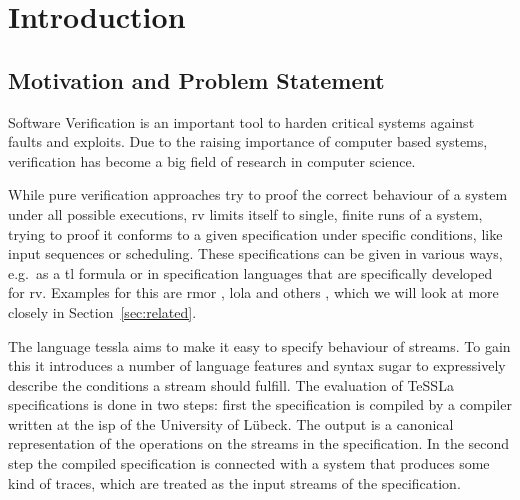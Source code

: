 %
\chapter{Introduction}
\label{sec:intro}


\section{Motivation and Problem Statement}
\label{sec:intro:motivation}

Software Verification is an important tool to harden critical systems against faults and exploits.
Due to the raising importance of computer based systems, verification has become a big field of research in computer science.

While pure verification approaches try to proof the correct behaviour of a system under all possible executions,
\gls{rv} limits itself to single, finite runs of a system, trying to proof it conforms to a given specification
under specific conditions, like input sequences or scheduling.
These specifications can be given in various ways, e.g.\ as a \gls{tl} formula or in specification languages that are specifically developed for \gls{rv}.
Examples for this are \gls{rmor} \citep{Havelund2008}, \gls{lola} \citep{DAngelo2005} and others \citep{Zheng2015, Pike2010, Mostafa2015}, which we will look at more closely in Section~\ref{sec:related}.

The language \gls{tessla} aims to make it easy to specify behaviour of streams.
To gain this it introduces a number of language features and syntax sugar to expressively describe the conditions a stream should fulfill.
The evaluation of TeSSLa specifications is done in two steps: first the specification is compiled by a compiler written at the \gls{isp} of the University of Lübeck.
The output is a canonical representation of the operations on the streams in the specification.
In the second step the compiled specification is connected with a system that produces some kind of traces, which are treated as the input streams of the specification.

